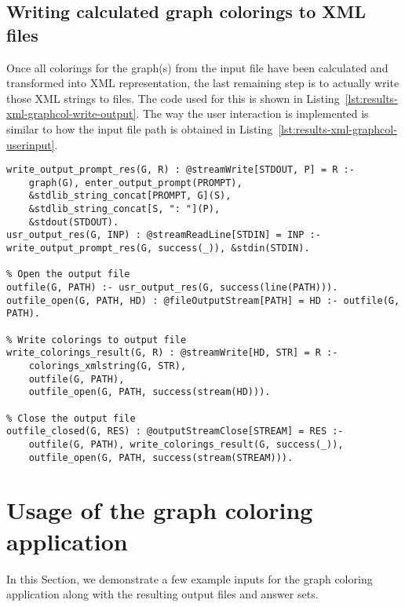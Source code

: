 \subsection{Writing calculated graph colorings to XML files}

Once all colorings for the graph(s) from the input file have been calculated and transformed into XML representation, the last remaining step is to actually write those XML strings to files. The code used for this is shown in Listing~\ref{lst:results-xml-graphcol-write-output}. The way the user interaction is implemented is similar to how the input file path is obtained in Listing~\ref{lst:results-xml-graphcol-userinput}.

\begin{lstlisting}[style=asp-code, label={lst:results-xml-graphcol-write-output}, caption={Writing Graph colorings to XML files.}]
% Prompt user for a path to which to write the calculated colorings for each graph
write_output_prompt_res(G, R) : @streamWrite[STDOUT, P] = R :- 
	graph(G), enter_output_prompt(PROMPT), 
	&stdlib_string_concat[PROMPT, G](S),
	&stdlib_string_concat[S, ": "](P),
	&stdout(STDOUT).
usr_output_res(G, INP) : @streamReadLine[STDIN] = INP :- write_output_prompt_res(G, success(_)), &stdin(STDIN).

% Open the output file
outfile(G, PATH) :- usr_output_res(G, success(line(PATH))).
outfile_open(G, PATH, HD) : @fileOutputStream[PATH] = HD :- outfile(G, PATH).

% Write colorings to output file
write_colorings_result(G, R) : @streamWrite[HD, STR] = R :- 
	colorings_xmlstring(G, STR), 
	outfile(G, PATH), 
	outfile_open(G, PATH, success(stream(HD))).

% Close the output file
outfile_closed(G, RES) : @outputStreamClose[STREAM] = RES :- 
	outfile(G, PATH), write_colorings_result(G, success(_)), 
	outfile_open(G, PATH, success(stream(STREAM))).
\end{lstlisting}

\section{Usage of the graph coloring application}

In this Section, we demonstrate a few example inputs for the graph coloring application along with the resulting output files and answer sets.

